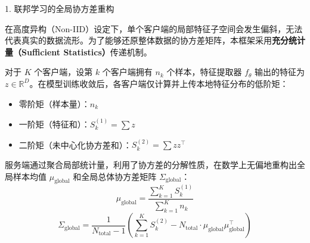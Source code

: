 \documentclass[11pt,aspectratio=169]{beamer}
\begin{document}
\begin{frame}{1. 联邦学习的全局协方差重构}
  \small

  \hspace{2em}在高度异构（Non-IID）设定下，单个客户端的局部特征子空间会发生偏斜，无法代表真实的数据流形。为了能够还原整体数据的协方差矩阵，本框架采用\textbf{充分统计量（Sufficient Statistics）}传递机制。

  \hspace{2em}对于 $K$ 个客户端，设第 $k$ 个客户端拥有 $n_k$ 个样本，特征提取器 $f_\theta$ 输出的特征为 $z \in \mathbb{R}^D$。在模型训练收敛后，各客户端仅计算并上传本地特征分布的低阶矩：
  \begin{itemize}
    \item 零阶矩（样本量）：$n_k$
    \item 一阶矩（特征和）：$S_k^{(1)} = \sum z$
    \item 二阶矩（未中心化协方差和）：$S_k^{(2)} = \sum z z^\top$
  \end{itemize}

  \hspace{2em}服务端通过聚合局部统计量，利用了协方差的分解性质，在数学上无偏地重构出全局样本均值 $\mu_{\mathrm{global}}$ 和全局总体协方差矩阵 $\Sigma_{\mathrm{global}}$：
  \[
    \mu_{\mathrm{global}} = \frac{\sum_{k=1}^K S_k^{(1)}}{\sum_{k=1}^K n_k}
  \]
  \[
    \Sigma_{\mathrm{global}} =
    \frac{1}{N_{\mathrm{total}}-1}
    \left(
      \sum_{k=1}^K S_k^{(2)} - N_{\mathrm{total}} \cdot \mu_{\mathrm{global}}\mu_{\mathrm{global}}^\top
    \right)
  \]
\end{frame}
\end{document}
